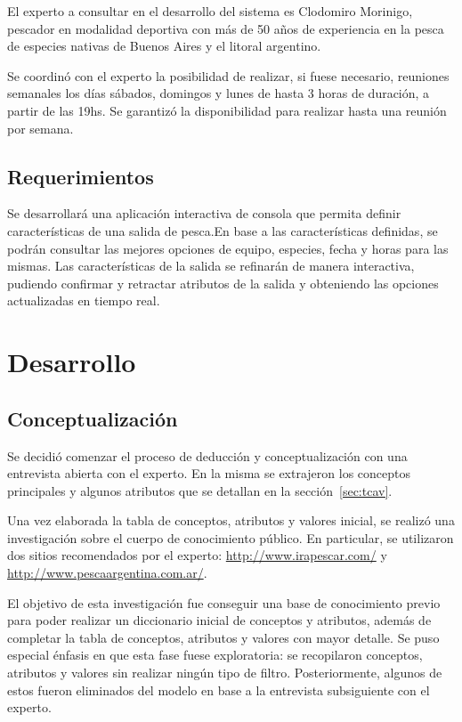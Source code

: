 \documentclass[a4paper,11pt]{article}
\begin{document}
El experto a consultar en el desarrollo del sistema es Clodomiro Morinigo,
pescador en modalidad deportiva con más de 50 años de experiencia en la pesca
de especies nativas de Buenos Aires y el litoral argentino.

Se coordinó con el experto la posibilidad de realizar, si fuese necesario,
reuniones semanales los días sábados, domingos y lunes de hasta 3 horas de
duración, a partir de las 19hs. Se garantizó la disponibilidad para realizar
hasta una reunión por semana.

\subsection{Requerimientos}

Se desarrollará una aplicación interactiva de consola que permita definir
características de una salida de pesca.En base a las características definidas,
se podrán consultar las mejores opciones de equipo, especies, fecha y horas
para las mismas. Las características de la salida se refinarán de manera
interactiva, pudiendo confirmar y retractar atributos de la salida y obteniendo
las opciones actualizadas en tiempo real.

\section{Desarrollo}

\subsection{Conceptualización}\label{sec:concept}

Se decidió comenzar el proceso de deducción y conceptualización con una
entrevista abierta con el experto. En la misma se extrajeron los conceptos
principales y algunos atributos que se detallan en la sección~\ref{sec:tcav}.

Una vez elaborada la tabla de conceptos, atributos y valores inicial, se
realizó una investigación sobre el cuerpo de conocimiento público. En
particular, se utilizaron dos sitios recomendados por el experto:
\url{http://www.irapescar.com/} y \url{http://www.pescaargentina.com.ar/}.

El objetivo de esta investigación fue conseguir una base de conocimiento previo
para poder realizar un diccionario inicial de conceptos y atributos, además de
completar la tabla de conceptos, atributos y valores con mayor detalle. Se puso
especial énfasis en que esta fase fuese exploratoria: se recopilaron conceptos,
atributos y valores sin realizar ningún tipo de filtro. Posteriormente, algunos
de estos fueron eliminados del modelo en base a la entrevista subsiguiente con
el experto.
\end{document}
